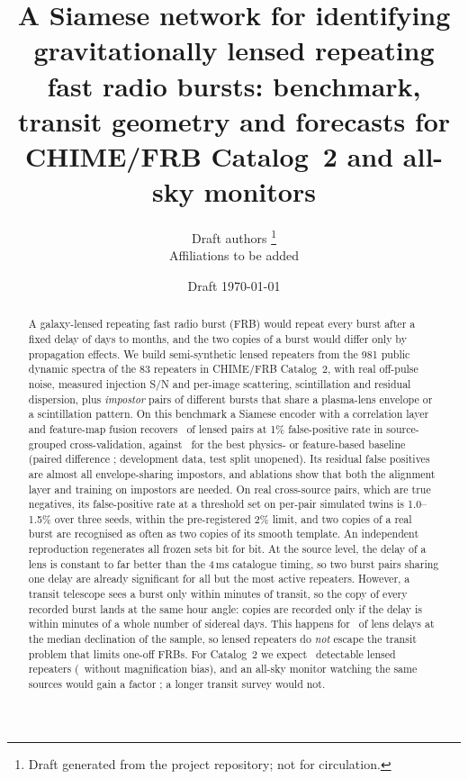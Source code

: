 \documentclass[fleqn,usenatbib]{mnras}
\title[Identifying lensed repeating FRBs]{A Siamese network for identifying gravitationally lensed repeating fast radio bursts:
benchmark, transit geometry and forecasts for CHIME/FRB Catalog~2 and all-sky monitors}
\author[Draft]{Draft authors \thanks{Draft generated from the project repository; not for circulation.}\\
Affiliations to be added}
\date{Draft \today}
\begin{document}
\label{firstpage}
\pagerange{\pageref{firstpage}--\pageref{lastpage}}
\maketitle

\begin{abstract}
A galaxy-lensed repeating fast radio burst (FRB) would repeat every burst after a fixed delay of days to months,
and the two copies of a burst would differ only by propagation effects.
We build semi-synthetic lensed repeaters from the 981 public dynamic spectra of the 83 repeaters in CHIME/FRB Catalog~2,
with real off-pulse noise, measured injection S/N and per-image scattering, scintillation and residual dispersion, plus
\emph{impostor} pairs of different bursts that share a plasma-lens envelope or a scintillation pattern.
On this benchmark a Siamese encoder with a correlation layer and feature-map fusion recovers
\RecallMsixOOF\ of lensed pairs at 1\% false-positive rate in source-grouped cross-validation, against \RecallGBMOOF\
for the best physics- or feature-based baseline (paired difference \DiffOOF; development data, test split unopened).
Its residual false positives are almost all envelope-sharing impostors, and ablations show that both the alignment layer
and training on impostors are needed. On real cross-source pairs, which are true negatives, its false-positive rate at
a threshold set on per-pair simulated twins is 1.0--1.5\% over three seeds, within the pre-registered 2\% limit, and two
copies of a real burst are recognised as often as two copies of its smooth template. An independent reproduction
regenerates all frozen sets bit for bit.
At the source level, the delay of a lens is constant to far better than the 4\,ms catalogue timing, so two burst
pairs sharing one delay are already significant for all but the most active repeaters.
However, a transit telescope sees a burst only within minutes of transit, so the copy of every recorded burst lands at
the same hour angle: copies are recorded only if the delay is within minutes of a whole number of sidereal days.
This happens for \PalignMedian\ of lens delays at the median declination of the sample, so lensed repeaters do
\emph{not} escape the transit problem that limits one-off FRBs.
For Catalog~2 we expect \NexpCHIMEbias\ detectable lensed repeaters (\NexpCHIME\ without magnification bias),
and an all-sky monitor watching the same sources would gain a factor \GainAllSky; a longer transit survey would not.
\end{abstract}
\end{document}
